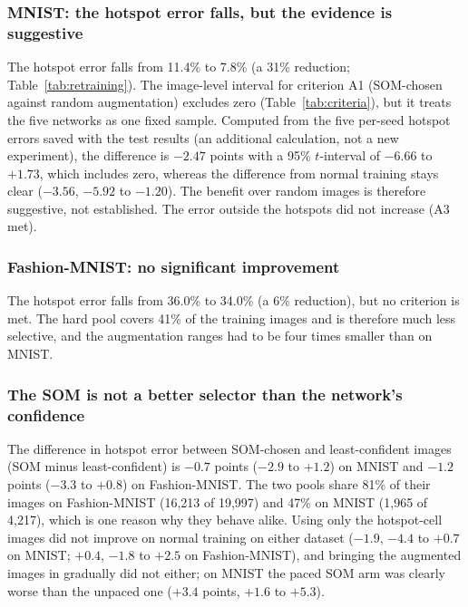 \documentclass[preprint,review,12pt]{elsarticle}
\begin{document}
\subsubsection{MNIST: the hotspot error falls, but the evidence is suggestive}
The hotspot error falls from 11.4\% to 7.8\% (a 31\% reduction; Table~\ref{tab:retraining}). The image-level interval for criterion A1 (SOM-chosen against random augmentation) excludes zero (Table~\ref{tab:criteria}), but it treats the five networks as one fixed sample. Computed from the five per-seed hotspot errors saved with the test results (an additional calculation, not a new experiment), the difference is $-2.47$ points with a 95\% $t$-interval of $-6.66$ to $+1.73$, which includes zero, whereas the difference from normal training stays clear ($-3.56$, $-5.92$ to $-1.20$). The benefit over random images is therefore suggestive, not established. The error outside the hotspots did not increase (A3 met).

\subsubsection{Fashion-MNIST: no significant improvement}
The hotspot error falls from 36.0\% to 34.0\% (a 6\% reduction), but no criterion is met. The hard pool covers 41\% of the training images and is therefore much less selective, and the augmentation ranges had to be four times smaller than on MNIST.

\subsubsection{The SOM is not a better selector than the network's confidence}
The difference in hotspot error between SOM-chosen and least-confident images (SOM minus least-confident) is $-0.7$ points ($-2.9$ to $+1.2$) on MNIST and $-1.2$ points ($-3.3$ to $+0.8$) on Fashion-MNIST. The two pools share 81\% of their images on Fashion-MNIST (16,213 of 19,997) and 47\% on MNIST (1,965 of 4,217), which is one reason why they behave alike. Using only the hotspot-cell images did not improve on normal training on either dataset ($-1.9$, $-4.4$ to $+0.7$ on MNIST; $+0.4$, $-1.8$ to $+2.5$ on Fashion-MNIST), and bringing the augmented images in gradually did not either; on MNIST the paced SOM arm was clearly worse than the unpaced one ($+3.4$ points, $+1.6$ to $+5.3$).
\end{document}
